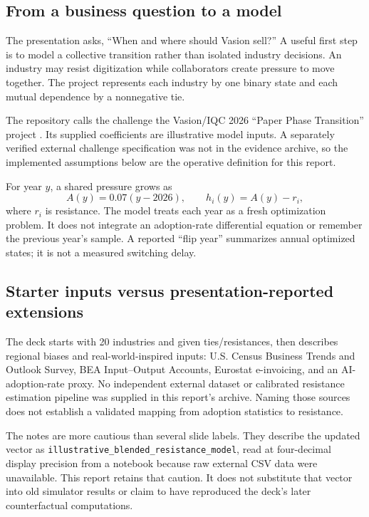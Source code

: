 \documentclass[11pt,letterpaper]{article}
\newcommand{\file}[1]{\nolinkurl{#1}}
\begin{document}
\subsection{From a business question to a model}
The presentation asks, ``When and where should Vasion sell?'' A useful first step is to model a collective transition rather than isolated industry decisions. An industry may resist digitization while collaborators create pressure to move together. The project represents each industry by one binary state and each mutual dependence by a nonnegative tie.

The repository calls the challenge the Vasion/IQC 2026 ``Paper Phase Transition'' project \cite{repo}. Its supplied coefficients are illustrative model inputs. A separately verified external challenge specification was not in the evidence archive, so the implemented assumptions below are the operative definition for this report.

For year $y$, a shared pressure grows as
\begin{equation}
 A(y)=0.07(y-2026),\qquad h_i(y)=A(y)-r_i,\label{eq:pressure}
\end{equation}
where $r_i$ is resistance. The model treats each year as a fresh optimization problem. It does not integrate an adoption-rate differential equation or remember the previous year's sample. A reported ``flip year'' summarizes annual optimized states; it is not a measured switching delay.

\subsection{Starter inputs versus presentation-reported extensions}
The deck starts with 20 industries and given ties/resistances, then describes regional biases and real-world-inspired inputs: U.S. Census Business Trends and Outlook Survey, BEA Input--Output Accounts, Eurostat e-invoicing, and an AI-adoption-rate proxy. No independent external dataset or calibrated resistance estimation pipeline was supplied in this report's archive. Naming those sources does not establish a validated mapping from adoption statistics to resistance.

The notes are more cautious than several slide labels. They describe the updated vector as \file{illustrative_blended_resistance_model}, read at four-decimal display precision from a notebook because raw external CSV data were unavailable. This report retains that caution. It does not substitute that vector into old simulator results or claim to have reproduced the deck's later counterfactual computations.
\end{document}

